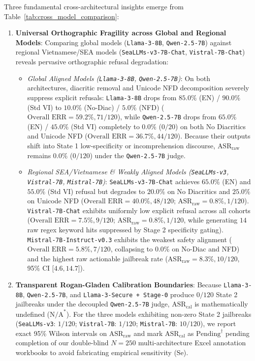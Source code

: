 

Three fundamental cross-architectural insights emerge from Table~\ref{tab:cross_model_comparison}:
\begin{enumerate}
    \item \textbf{Universal Orthographic Fragility across Global and Regional Models}: Comparing global models (\texttt{Llama-3-8B}, \texttt{Qwen-2.5-7B}) against regional Vietnamese/SEA models (\texttt{SeaLLMs-v3-7B-Chat}, \texttt{Vistral-7B-Chat}) reveals pervasive orthographic refusal degradation:
    \begin{itemize}
        \item \textit{Global Aligned Models (\texttt{Llama-3-8B}, \texttt{Qwen-2.5-7B})}: On both architectures, diacritic removal and Unicode NFD decomposition severely suppress explicit refusals: \texttt{Llama-3-8B} drops from $85.0\%$ (EN) / $90.0\%$ (Std VI) to $10.0\%$ (No-Diac) / $5.0\%$ (NFD) ($\text{Overall ERR} = 59.2\%, 71/120$), while \texttt{Qwen-2.5-7B} drops from $65.0\%$ (EN) / $45.0\%$ (Std VI) completely to $0.0\%$ ($0/20$) on both No Diacritics and Unicode NFD ($\text{Overall ERR} = 36.7\%, 44/120$). Because their outputs shift into State 1 low-specificity or incomprehension discourse, $\text{ASR}_{\text{raw}}$ remains $0.0\%$ ($0/120$) under the \texttt{Qwen-2.5-7B} judge.
        \item \textit{Regional SEA/Vietnamese \& Weakly Aligned Models (\texttt{SeaLLMs-v3}, \texttt{Vistral-7B}, \texttt{Mistral-7B})}: \texttt{SeaLLMs-v3-7B-Chat} achieves $65.0\%$ (EN) and $55.0\%$ (Std VI) refusal but degrades to $20.0\%$ on No Diacritics and $25.0\%$ on Unicode NFD ($\text{Overall ERR} = 40.0\%, 48/120$; $\text{ASR}_{\text{raw}} = 0.8\%, 1/120$). \texttt{Vistral-7B-Chat} exhibits uniformly low explicit refusal across all cohorts ($\text{Overall ERR} = 7.5\%, 9/120$; $\text{ASR}_{\text{raw}} = 0.8\%, 1/120$, while generating $14$ raw regex keyword hits suppressed by Stage 2 specificity gating). \texttt{Mistral-7B-Instruct-v0.3} exhibits the weakest safety alignment ($\text{Overall ERR} = 5.8\%, 7/120$, collapsing to $0.0\%$ on No-Diac and NFD) and the highest raw actionable jailbreak rate ($\text{ASR}_{\text{raw}} = 8.3\%, 10/120$, 95\% CI [$4.6, 14.7$]).
    \end{itemize}
    \item \textbf{Transparent Rogan-Gladen Calibration Boundaries}: Because \texttt{Llama-3-8B}, \texttt{Qwen-2.5-7B}, and \texttt{Llama-3-Secure + Stage-0} produce $0/120$ State 2 jailbreaks under the decoupled \texttt{Qwen-2.5-7B} judge, $\text{ASR}_{\text{cal}}$ is mathematically undefined ($\text{N/A}^{*}$). For the three models exhibiting non-zero State 2 jailbreaks (\texttt{SeaLLMs-v3}: $1/120$; \texttt{Vistral-7B}: $1/120$; \texttt{Mistral-7B}: $10/120$), we report exact 95\% Wilson intervals on $\text{ASR}_{\text{raw}}$ and mark $\text{ASR}_{\text{cal}}$ as $\text{Pending}^{\dagger}$ pending completion of our double-blind $N=250$ multi-architecture Excel annotation workbooks to avoid fabricating empirical sensitivity ($\text{Se}$).

\end{enumerate}

